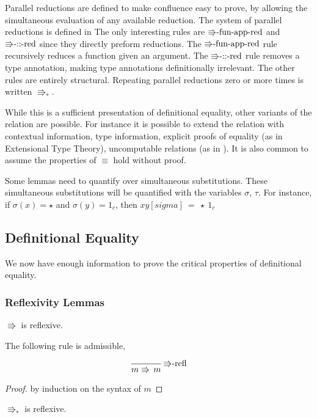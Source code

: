 Parallel reductions are defined to make confluence easy to prove, by allowing the simultaneous evaluation of any available reduction.
The system of parallel reductions is defined in  The only interesting rules are $\textrm{\ensuremath{\Rrightarrow}-fun-app-red}$ and $\textrm{\ensuremath{\Rrightarrow}-::-red}$ since they directly preform reductions.
The $\textrm{\ensuremath{\Rrightarrow}-fun-app-red}$ rule recursively reduces a function given an argument.
The $\textrm{\ensuremath{\Rrightarrow}-::-red}$ rule removes a type annotation, making type annotations definitionally irrelevant.
The other rules are entirely structural.
Repeating parallel reductions zero or more times is written $\Rrightarrow_{\ast}$.

While this is a sufficient presentation of definitional equality, other variants of the relation are possible.
For instance it is possible to extend the relation with contextual information, type information, explicit proofs of equality (as in Extensional Type Theory), uncomputable relations (as in \cite{jia2010dependent}).
It is also common to assume the properties of $\equiv$ hold without proof.

Some lemmas need to quantify over simultaneous substitutions.
These simultaneous substitutions will be quantified with the variables $\sigma$, $\tau$.
For instance, if $\sigma(x) = \star$ and $\sigma(y) = 1_c$, then $x y[sigma]\ =\ \star\ 1_c$


\subsection{Definitional Equality}

We now have enough information to prove the critical properties of definitional equality.

\subsubsection{Reflexivity Lemmas}
\begin{lem}
$\Rrightarrow$ is reflexive.

The following rule is admissible,

\[
\frac{\,}{m\Rrightarrow\,m}\,\textrm{\ensuremath{\Rrightarrow}-refl}
\]
\end{lem}

\begin{proof}
by induction on the syntax of $m$
\end{proof}
\begin{fact}
$\Rrightarrow_{\ast}$ is reflexive.
\end{fact}

